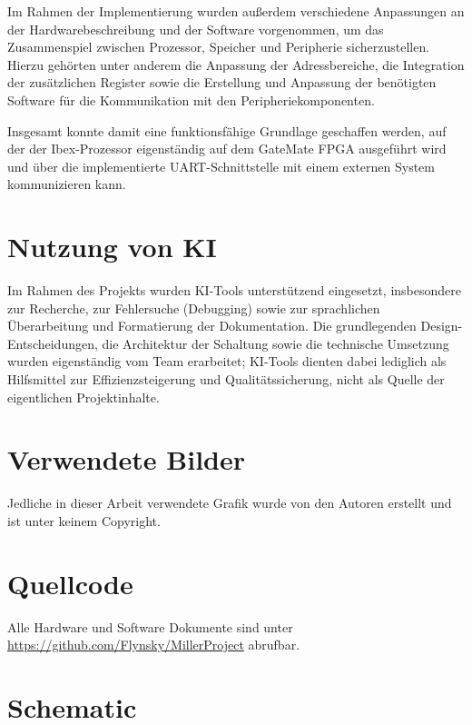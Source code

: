 \documentclass[a4paper,11pt]{article}
\begin{document}
Im Rahmen der Implementierung wurden außerdem verschiedene Anpassungen an der Hardwarebeschreibung und der Software vorgenommen, um das Zusammenspiel zwischen Prozessor, Speicher und Peripherie sicherzustellen. Hierzu gehörten unter anderem die Anpassung der Adressbereiche, die Integration der zusätzlichen Register sowie die Erstellung und Anpassung der benötigten Software für die Kommunikation mit den Peripheriekomponenten.

Insgesamt konnte damit eine funktionsfähige Grundlage geschaffen werden, auf der der Ibex-Prozessor eigenständig auf dem GateMate FPGA ausgeführt wird und über die implementierte UART-Schnittstelle mit einem externen System kommunizieren kann.

\section{Nutzung von KI}
Im Rahmen des Projekts wurden KI-Tools unterstützend eingesetzt, insbesondere zur Recherche, zur Fehlersuche (Debugging) sowie zur sprachlichen Überarbeitung und Formatierung der Dokumentation. Die grundlegenden Design-Entscheidungen, die Architektur der Schaltung sowie die technische Umsetzung wurden eigenständig vom Team erarbeitet; KI-Tools dienten dabei lediglich als Hilfsmittel zur Effizienzsteigerung und Qualitätssicherung, nicht als Quelle der eigentlichen Projektinhalte.

\section{Verwendete Bilder}
Jedliche in dieser Arbeit verwendete Grafik wurde von den Autoren erstellt und ist unter keinem Copyright.

\section{Quellcode}
Alle Hardware und Software Dokumente sind unter \href{https://github.com/Flynsky/MillerProject}{https://github.com/Flynsky/MillerProject} abrufbar.

\section{Schematic}

\end{document}
